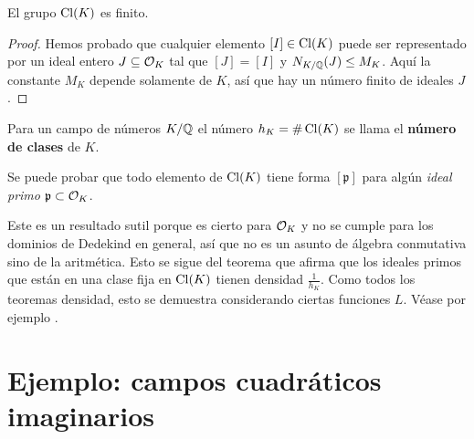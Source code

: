 \begin{teorema}
  El grupo $\operatorname{Cl} (K)$ es finito.

  \begin{proof}
    Hemos probado que cualquier elemento $[I] \in \operatorname{Cl} (K)$ puede ser
    representado por un ideal entero $J \subseteq \mathcal{O}_K$ tal que $[J] = [I]$ y
    $N_{K/\mathbb{Q}} (J) \le M_K$. Aquí la constante $M_K$ depende solamente de $K$,
    así que hay un número finito de ideales $J$.
  \end{proof}
\end{teorema}

\begin{definicion}
  Para un campo de números $K/\mathbb{Q}$ el número $h_K = \# \operatorname{Cl} (K)$ se llama el
  \textbf{número de clases} de $K$.
\end{definicion}

\begin{comentario}
  \label{com:clases-representadas-por-ideales-primos}
  Se puede probar que todo elemento de $\operatorname{Cl} (K)$ tiene forma $[\mathfrak{p}]$
  para algún \emph{ideal primo} $\mathfrak{p} \subset \mathcal{O}_K$.

  Este es un resultado sutil porque es cierto para $\mathcal{O}_K$ y no se cumple para
  los dominios de Dedekind en general, así que no es un asunto de álgebra
  conmutativa sino de la aritmética. Esto se sigue del teorema que afirma que
  los ideales primos que están en una clase fija en $\operatorname{Cl} (K)$ tienen densidad
  $\frac{1}{h_K}$. Como todos los teoremas densidad, esto se demuestra
  considerando ciertas funciones $L$. Véase por ejemplo
  \cite[\S VII.13]{Neukirch-ANT}.
\end{comentario}


\section{Ejemplo: campos cuadráticos imaginarios}

